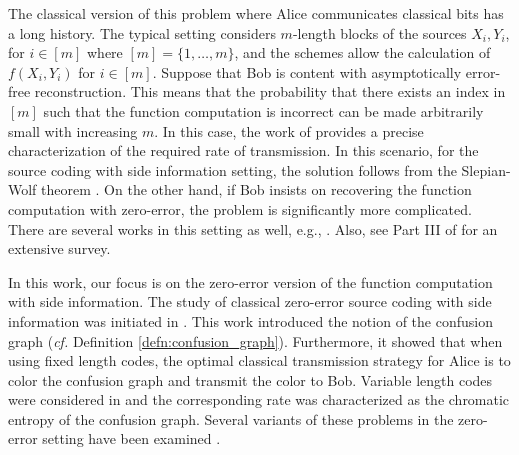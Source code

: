 \documentclass[journal, onecolumn, draftcls]{IEEEtran}
\theoremstyle{definition}
\newcommand{\meng}[1]{\marginpar{+}{\bf Ruoyu's remark}: {\em #1}}
\newcommand{\aditya}[1]{\marginpar{+}{\bf Aditya's remark}: {\em #1}}
\begin{document}
The classical version of this problem where Alice communicates classical bits has a long history. The typical setting considers $m$-length blocks of the sources $X_i, Y_i$, for $i \in [m]$ where $[m]= \{1, \dots, m\}$, and the schemes allow the calculation of $f(X_i, Y_i)$ for $i \in [m]$. Suppose that Bob is content with asymptotically error-free reconstruction. This means that the probability that there exists an index in $[m]$ such that the function computation is incorrect can be made arbitrarily small with increasing $m$. In this case, the work of \cite{OrlitskyR_01} provides a precise characterization of the required rate of transmission. In this scenario, for the source coding with side information setting, the solution follows from the Slepian-Wolf theorem \cite{slepian1973noiseless}. On the other hand, if Bob insists on recovering the function computation with zero-error, the problem is significantly more complicated. There are several works in this setting as well, e.g.,
\cite{Witsenhausen_76,FergusonB_75,ahlswede1979coloring,AlonO_95,LinialV89,OrlitskyR_01,KornerO_98,Charpenay_23}. Also, see  Part III of \cite{KornerO_98} for an extensive survey. 


In this work, our focus is on the zero-error version of the function computation with side information. %
The study of classical zero-error source coding with side information was initiated in \cite{Witsenhausen_76}. This work introduced the notion of the confusion graph ({\it cf.} Definition \ref{defn:confusion_graph}). Furthermore, it showed that when using fixed length codes, the optimal classical transmission strategy for Alice is to color the confusion graph and transmit the color to Bob. Variable length codes were considered in \cite{AlonO_96} and the corresponding rate was characterized as the chromatic entropy of the confusion graph. Several variants of these problems in the zero-error setting have been examined \cite{CharpenayTR23ITW, CharpenayTR23ISIT, AlonO_96, Shayevitz_14, Malak_22}. %


\end{document}
